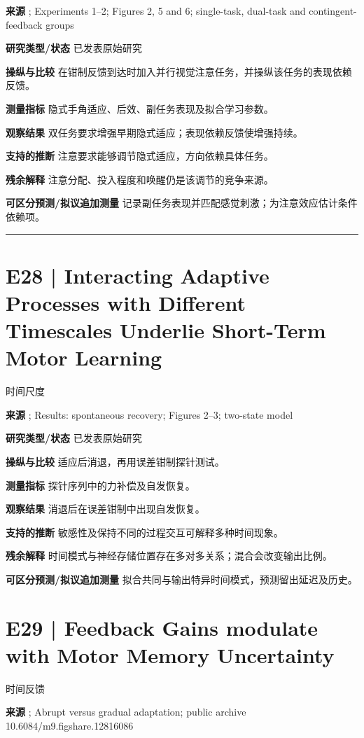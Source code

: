 \documentclass[11pt,a4paper]{article}
\begin{document}
\textbf{来源} \cite{attention2026}; Experiments 1--2; Figures 2, 5 and 6; single-task, dual-task and contingent-feedback groups\par
\textbf{研究类型/状态} 已发表原始研究\par
\textbf{操纵与比较} 在钳制反馈到达时加入并行视觉注意任务，并操纵该任务的表现依赖反馈。\par
\textbf{测量指标} 隐式手角适应、后效、副任务表现及拟合学习参数。\par
\textbf{观察结果} 双任务要求增强早期隐式适应；表现依赖反馈使增强持续。\par
\textbf{支持的推断} 注意要求能够调节隐式适应，方向依赖具体任务。\par
\textbf{残余解释} 注意分配、投入程度和唤醒仍是该调节的竞争来源。\par
\textbf{可区分预测/拟议追加测量} 记录副任务表现并匹配感觉刺激；为注意效应估计条件依赖项。\par
\bigskip\hrule\medskip\section{E28 | Interacting Adaptive Processes with Different Timescales Underlie Short-Term Motor Learning}
{\small\sffamily\color{navy} 时间尺度}\par
\textbf{来源} \cite{smith2006}; Results: spontaneous recovery; Figures 2--3; two-state model\par
\textbf{研究类型/状态} 已发表原始研究\par
\textbf{操纵与比较} 适应后消退，再用误差钳制探针测试。\par
\textbf{测量指标} 探针序列中的力补偿及自发恢复。\par
\textbf{观察结果} 消退后在误差钳制中出现自发恢复。\par
\textbf{支持的推断} 敏感性及保持不同的过程交互可解释多种时间现象。\par
\textbf{残余解释} 时间模式与神经存储位置存在多对多关系；混合会改变输出比例。\par
\textbf{可区分预测/拟议追加测量} 拟合共同与输出特异时间模式，预测留出延迟及历史。\par
\clearpage\section{E29 | Feedback Gains modulate with Motor Memory Uncertainty}
{\small\sffamily\color{navy} 时间反馈}\par
\textbf{来源} \cite{franklin2021}; Abrupt versus gradual adaptation; public archive 10.6084/m9.figshare.12816086\par
\end{document}
